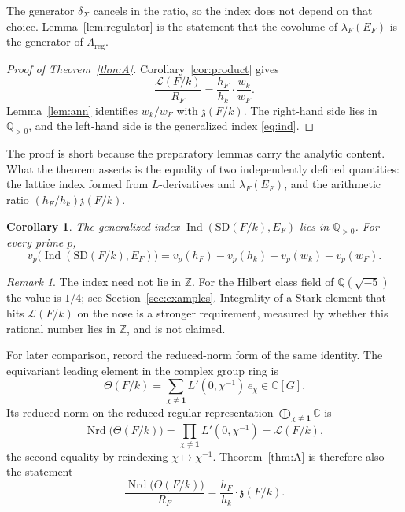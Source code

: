 \documentclass[11pt]{article}
\theoremstyle{plain}
\newtheorem{corollary}[theorem]{Corollary}
\theoremstyle{definition}
\theoremstyle{remark}
\newtheorem{remark}[theorem]{Remark}
\newcommand{\Z}{\mathbb{Z}}
\newcommand{\Q}{\mathbb{Q}}
\newcommand{\C}{\mathbb{C}}
\newcommand{\Ind}{\operatorname{Ind}}
\newcommand{\triv}{\mathbf{1}}
\newcommand{\SD}{\mathrm{SD}}
\newcommand{\Nrd}{\operatorname{Nrd}}
\begin{document}
The generator $\delta_X$ cancels in the ratio, so the index does not depend on that choice.
Lemma~\ref{lem:regulator} is the statement that the covolume of $\lambda_F(E_F)$ is the generator of $\Lambda_{\mathrm{reg}}$.

\begin{proof}[Proof of Theorem~\ref{thm:A}]
Corollary~\ref{cor:product} gives
\[
  \frac{\mathcal{L}(F/k)}{R_F}
  =\frac{h_F}{h_k}\cdot\frac{w_k}{w_F}.
\]
Lemma~\ref{lem:ann} identifies $w_k/w_F$ with $\mathfrak{z}(F/k)$.
The right-hand side lies in $\Q_{>0}$, and the left-hand side is the generalized index \eqref{eq:ind}.
\end{proof}

The proof is short because the preparatory lemmas carry the analytic content.
What the theorem asserts is the equality of two independently defined quantities: the lattice index formed from $L$-derivatives and $\lambda_F(E_F)$, and the arithmetic ratio $(h_F/h_k)\mathfrak{z}(F/k)$.

\begin{corollary}
\label{cor:rational}
The generalized index $\Ind(\SD(F/k),E_F)$ lies in $\Q_{>0}$.
For every prime $p$,
\begin{equation}
\label{eq:vp}
  v_p\bigl(\Ind(\SD(F/k),E_F)\bigr)
  =v_p(h_F)-v_p(h_k)+v_p(w_k)-v_p(w_F).
\end{equation}
\end{corollary}

\begin{remark}
\label{rem:not-integral}
The index need not lie in $\Z$.
For the Hilbert class field of $\Q(\sqrt{-5})$ the value is $1/4$; see Section~\ref{sec:examples}.
Integrality of a Stark element that hits $\mathcal{L}(F/k)$ on the nose is a stronger requirement, measured by whether this rational number lies in $\Z$, and is not claimed.
\end{remark}

For later comparison, record the reduced-norm form of the same identity.
The equivariant leading element in the complex group ring is
\begin{equation}
\label{eq:Theta}
  \Theta(F/k)
  =\sum_{\chi\neq\triv}L'(0,\chi^{-1})\,e_{\chi}\in\C[G].
\end{equation}
Its reduced norm on the reduced regular representation $\bigoplus_{\chi\neq\triv}\C$ is
\[
  \Nrd\bigl(\Theta(F/k)\bigr)
  =\prod_{\chi\neq\triv}L'(0,\chi^{-1})
  =\mathcal{L}(F/k),
\]
the second equality by reindexing $\chi\mapsto\chi^{-1}$.
Theorem~\ref{thm:A} is therefore also the statement
\[
  \frac{\Nrd\bigl(\Theta(F/k)\bigr)}{R_F}
  =\frac{h_F}{h_k}\cdot\mathfrak{z}(F/k).
\]
\end{document}
